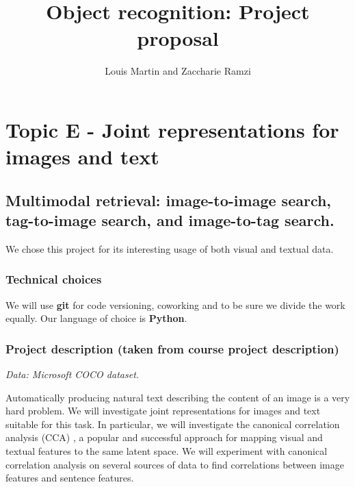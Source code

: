 \documentclass[a4paper,12pt]{article}
\let\oldsection\section
\renewcommand\section{\clearpage\oldsection}
\begin{document}
\title{Object recognition: Project proposal}
\author{Louis Martin and Zaccharie Ramzi}

\maketitle
\pagebreak

\section*{Topic E - Joint representations for images and text}
\subsection*{Multimodal retrieval: image-to-image search, tag-to-image search,
and image-to-tag search.}

We chose this project for its interesting usage of both visual and textual data.\\
\subsubsection*{Technical choices}
We will use \textbf{git} for code versioning, coworking and to be sure we divide the work
equally. Our language of choice is \textbf{Python}.

\subsubsection*{Project description (taken from course project description)}
\textit{Data: Microsoft COCO dataset.}

Automatically producing natural text describing the content of an image is a
very hard problem. We will investigate joint representations for images and text
suitable for this task. In particular, we will investigate the canonical
correlation analysis (CCA) \cite{normalizedcca}, a popular and successful approach for mapping
visual and textual features to the same latent space. We will experiment with
canonical correlation analysis on several sources of data to find correlations
between image features and sentence features.
\end{document}
